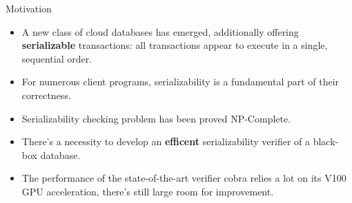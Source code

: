 
\begin{frame}{Motivation}
	\begin{itemize}
		\item A new class of cloud databases has emerged, additionally offering \textbf{serializable} transactions: all transactions appear to execute in a single, sequential order.
		\item For numerous client programs, serializability is a fundamental part of their correctness.
		\item Serializability checking problem has been proved NP-Complete.
		\item There's a necessity to develop an \textbf{efficent} serializability verifier of a black-box database.
		\item The performance of the state-of-the-art verifier cobra relies a lot on its V100 GPU acceleration, there's still large room for improvement.
	\end{itemize}
\end{frame}

